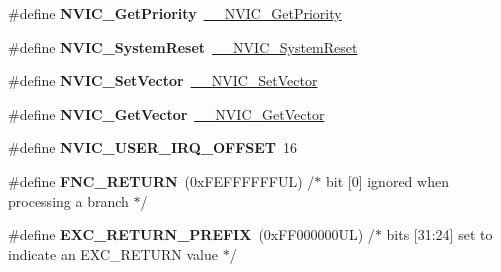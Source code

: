 \begin{DoxyCompactItemize}
\#define {\bfseries N\+V\+I\+C\+\_\+\+Get\+Priority}~\hyperlink{group___c_m_s_i_s___core___n_v_i_c_functions_gaeb9dc99c8e7700668813144261b0bc73}{\+\_\+\+\_\+\+N\+V\+I\+C\+\_\+\+Get\+Priority}
\item 
\mbox{\label{group___c_m_s_i_s___core___n_v_i_c_functions_ga6aa0367d3642575610476bf0366f0c48}} 
\#define {\bfseries N\+V\+I\+C\+\_\+\+System\+Reset}~\hyperlink{group___c_m_s_i_s___core___n_v_i_c_functions_ga0d9aa2d30fa54b41eb780c16e35b676c}{\+\_\+\+\_\+\+N\+V\+I\+C\+\_\+\+System\+Reset}
\item 
\mbox{\label{group___c_m_s_i_s___core___n_v_i_c_functions_ga804af63bb4c4c317387897431814775d}} 
\#define {\bfseries N\+V\+I\+C\+\_\+\+Set\+Vector}~\hyperlink{group___c_m_s_i_s___core___n_v_i_c_functions_ga0df355460bc1783d58f9d72ee4884208}{\+\_\+\+\_\+\+N\+V\+I\+C\+\_\+\+Set\+Vector}
\item 
\mbox{\label{group___c_m_s_i_s___core___n_v_i_c_functions_ga955eb1c33a3dcc62af11a8385e8c0fc8}} 
\#define {\bfseries N\+V\+I\+C\+\_\+\+Get\+Vector}~\hyperlink{group___c_m_s_i_s___core___n_v_i_c_functions_ga44b665d2afb708121d9b10c76ff00ee5}{\+\_\+\+\_\+\+N\+V\+I\+C\+\_\+\+Get\+Vector}
\item 
\mbox{\label{group___c_m_s_i_s___core___n_v_i_c_functions_ga8045d905a5ca57437d8e6f71ffcb6df5}} 
\#define {\bfseries N\+V\+I\+C\+\_\+\+U\+S\+E\+R\+\_\+\+I\+R\+Q\+\_\+\+O\+F\+F\+S\+ET}~16
\item 
\mbox{\label{group___c_m_s_i_s___core___n_v_i_c_functions_gabaa62910bf89acc186ae998c611e64ab}} 
\#define {\bfseries F\+N\+C\+\_\+\+R\+E\+T\+U\+RN}~(0x\+F\+E\+F\+F\+F\+F\+F\+F\+U\+L)     /$\ast$ bit \mbox{[}0\mbox{]} ignored when processing a branch                             $\ast$/
\item 
\mbox{\label{group___c_m_s_i_s___core___n_v_i_c_functions_ga99e0c1c19f050880a8bd827a7f420bec}} 
\#define {\bfseries E\+X\+C\+\_\+\+R\+E\+T\+U\+R\+N\+\_\+\+P\+R\+E\+F\+IX}~(0x\+F\+F000000\+U\+L)     /$\ast$ bits \mbox{[}31\+:24\mbox{]} set to indicate an E\+X\+C\+\_\+\+R\+E\+T\+U\+R\+N value                     $\ast$/

\end{DoxyCompactItemize}
